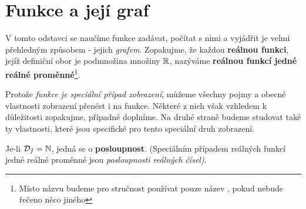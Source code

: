   \section{Funkce a její graf}\label{mai:IchapIIIsecI}
    V tomto odstavci se naučíme funkce zadávat, počítat s nimi a vyjádřit je velmi přehledným 
    způsobem - jejich \emph{grafem}. Zopakujme, že každou \textbf{reálnou funkci}, jejíž 
    definiční obor je podmnožina množiny \(\mathbb{R}\), nazýváme \textbf{reálnou funkcí jedné 
    reálné proměnné}\footnote{Místo názvu  budeme pro 
    stručnost používat pouze název , pokud nebude řečeno něco jiného}.
    
    Protože \emph{funkce je speciální případ zobrazení}, můžeme všech\-ny pojmy a obecné 
    vlastnosti zobrazení přenést i na funkce. Některé z nich však vzhledem k důležitosti 
    zopakujme, případně doplníme. Na druhé straně budeme studovat také ty vlastnosti, které jsou 
    specifické pro tento speciální druh zobrazení.
    
    \begin{note}
      Je-li \(\mathcal{D}_f = \mathbb{N}\), jedná se o \textbf{posloupnost}. (Speciálním 
      případem reálných funkcí jedné reálné proměnné jsou \emph{posloupnosti reálných čísel)}.
    \end{note}
      
